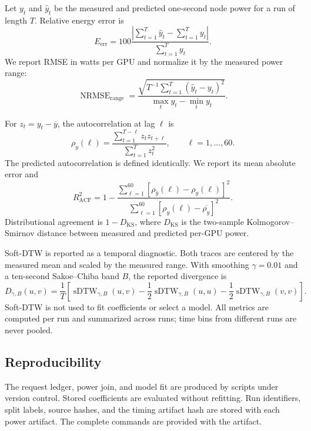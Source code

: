 Let $y_t$ and $\widehat y_t$ be the measured and predicted one-second node
power for a run of length $T$.  Relative energy error is
\begin{equation}
  E_{\mathrm{err}}=100
  \frac{\left|\sum_{t=1}^T\widehat y_t-\sum_{t=1}^Ty_t\right|}
       {\sum_{t=1}^Ty_t}.
  \label{eq:energy-error}
\end{equation}
We report RMSE in watts per GPU and normalize it by the measured power range:
\begin{equation}
  \operatorname{NRMSE}_{\mathrm{range}}=
  \frac{\sqrt{T^{-1}\sum_{t=1}^T(\widehat y_t-y_t)^2}}
       {\max_t y_t-\min_t y_t}.
  \label{eq:nrmse}
\end{equation}

For $z_t=y_t-\overline y$, the autocorrelation at lag $\ell$ is
\begin{equation}
  \rho_y(\ell)=
  \frac{\sum_{t=1}^{T-\ell}z_tz_{t+\ell}}
       {\sum_{t=1}^{T}z_t^2},
  \qquad \ell=1,\ldots,60.
  \label{eq:acf}
\end{equation}
The predicted autocorrelation is defined identically.  We report its mean
absolute error and
\begin{equation}
  R^2_{\mathrm{ACF}}=1-
  \frac{\sum_{\ell=1}^{60}
  [\rho_{\widehat y}(\ell)-\rho_y(\ell)]^2}
  {\sum_{\ell=1}^{60}
  [\rho_y(\ell)-\overline{\rho_y}]^2}.
  \label{eq:acf-r2}
\end{equation}
Distributional agreement is $1-D_{\mathrm{KS}}$, where $D_{\mathrm{KS}}$ is
the two-sample Kolmogorov--Smirnov distance between measured and predicted
per-GPU power.

Soft-DTW is reported as a temporal diagnostic.  Both traces are centered by
the measured mean and scaled by the measured range.  With smoothing
$\gamma=0.01$ and a ten-second Sakoe--Chiba band $B$, the reported divergence is
\begin{equation}
  D_{\gamma,B}(u,v)=\frac{1}{T}\left[
  \operatorname{sDTW}_{\gamma,B}(u,v)
  -\frac{1}{2}\operatorname{sDTW}_{\gamma,B}(u,u)
  -\frac{1}{2}\operatorname{sDTW}_{\gamma,B}(v,v)\right].
  \label{eq:soft-dtw}
\end{equation}
Soft-DTW is not used to fit coefficients or select a model.  All metrics are
computed per run and summarized across runs; time bins from different runs are
never pooled.

\subsection{Reproducibility}

The request ledger, power join, and model fit are produced by scripts under
version control.  Stored coefficients are evaluated without refitting.
Run identifiers, split labels, source hashes, and the timing artifact hash are
stored with each power artifact.  The complete commands are provided with the
artifact.
